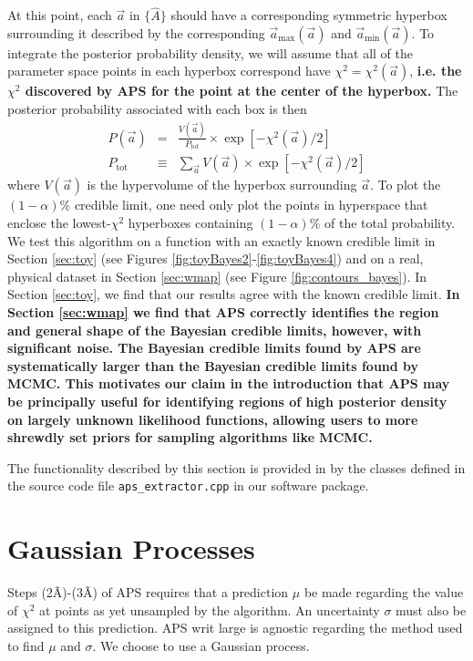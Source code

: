 \documentclass[useAMS,usenatbib]{aastex}
\newcommand{\APS}{APS }
\begin{document}
At this point, each $\vec{a}$ in $\{\hat{A}\}$ should have a corresponding symmetric hyperbox
surrounding it described by the corresponding 
$\vec{a}_\text{max}(\vec{a})$ and $\vec{a}_\text{min}(\vec{a})$.  
To integrate the posterior probability density, we will assume that all of the
parameter space points in each hyperbox correspond have $\chi^2=\chi^2(\vec{a})$,
{\bf %
i.e. the $\chi^2$ discovered by APS for the point at the center of the hyperbox.
} %
The posterior probability associated with each box is then
\begin{eqnarray}
P(\vec{a})&=&\frac{V(\vec{a})}{P_\text{tot}}\times\exp\left[-\chi^2(\vec{a})/2\right]
\label{eqn:posterior}\\
P_\text{tot}&\equiv&\sum_{\vec{a}} V(\vec{a})\times\exp\left[-\chi^2(\vec{a})/2\right]
\end{eqnarray}
where $V(\vec{a})$ is the hypervolume of the hyperbox surrounding $\vec{a}$.
To plot the $(1-\alpha)\%$ credible limit, one need only plot the points in hyperspace that
enclose the lowest-$\chi^2$ hyperboxes containing $(1-\alpha)\%$ of the total probability.
We test this algorithm on a function with an exactly known credible limit
in Section \ref{sec:toy} (see Figures \ref{fig:toyBayes2}-\ref{fig:toyBayes4}) 
and on a real, physical dataset in Section \ref{sec:wmap} (see Figure \ref{fig:contours_bayes}).  
In  Section \ref{sec:toy}, we find that our results agree with the known credible limit.
{\bf %
In Section \ref{sec:wmap} we find that APS correctly identifies the region and general
shape of the Bayesian credible limits, however, with significant noise.  The Bayesian
credible limits found by APS are systematically larger than the Bayesian credible
limits found by MCMC.  This motivates our claim in the introduction that APS may be
principally useful for identifying regions of high posterior density on largely unknown
likelihood functions, allowing users to more shrewdly set priors for sampling
algorithms like MCMC.
}%

The functionality described by this section is provided in by the classes defined in the source
code file \verb|aps_extractor.cpp| in our software package.


\section{Gaussian Processes}
\label{sec:gp}

Steps (2\~A)-(3\~A) of \APS requires that a prediction $\mu$ be made regarding the value
of $\chi^2$ at points as yet unsampled by the algorithm.  An uncertainty $\sigma$
must also be assigned to this prediction.  APS writ large is agnostic regarding
the method used to find $\mu$ and $\sigma$.  We choose to use a Gaussian process.
\end{document}
